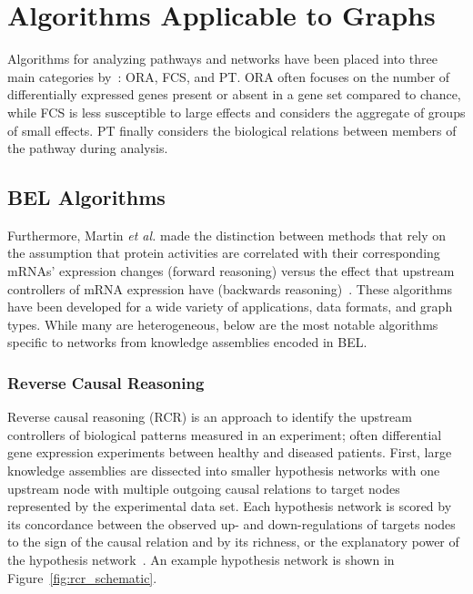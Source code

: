 \section{Algorithms Applicable to Graphs}
\label{sec:algorithms}

Algorithms for analyzing pathways and networks have been placed  into three main categories by~\cite{Khatri2012}: \ac{ORA}, \ac{FCS}, and \ac{PT}.
\ac{ORA} often focuses on the number of differentially expressed genes present or absent in a gene set compared to chance, while \ac{FCS} is less susceptible to large effects and considers the aggregate of groups of small effects.
\ac{PT} finally considers the biological relations between members of the pathway during analysis.

\subsection{BEL Algorithms}
\label{subsec:bel_algorithms}

Furthermore, Martin \textit{et al.} made the distinction between methods that rely on the assumption that protein activities are correlated with their corresponding mRNAs' expression changes (forward reasoning) versus the effect that upstream controllers of mRNA expression have (backwards reasoning)~\cite{Martin2014}.
These algorithms have been developed for a wide variety of applications, data formats, and graph types.
While many are heterogeneous, below are the most notable algorithms specific to networks from knowledge assemblies encoded in BEL.

\subsubsection{Reverse Causal Reasoning}

Reverse causal reasoning (\ac{RCR}) is an approach to identify the upstream controllers of biological patterns measured in an experiment; often differential gene expression experiments between healthy and diseased patients.
First, large knowledge assemblies are dissected into smaller hypothesis networks with one upstream node with multiple outgoing causal relations to target nodes represented by the experimental data set.
Each hypothesis network is scored by its concordance between the observed up- and down-regulations of targets nodes to the sign of the causal relation and by its richness, or the explanatory power of the hypothesis network~\cite{Catlett2013}.
An example hypothesis network is shown in Figure~\ref{fig:rcr_schematic}.

